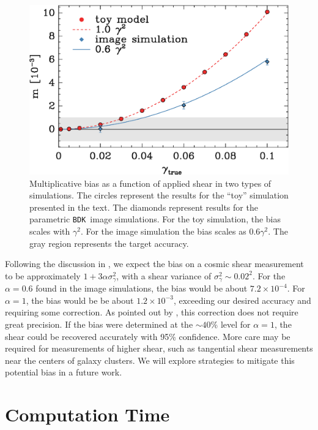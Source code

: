 \documentclass[iop]{emulateapj}
\newcommand{\bdksim}{\texttt{BDK}}
\begin{document}
\begin{figure}
	\centering
    \includegraphics[width=\columnwidth]{weaklens-approx.eps}

    \caption{Multiplicative bias as a function of applied shear in two types of
    simulations.  The circles represent the results for the ``toy'' simulation
    presented in the text.  The diamonds represent results for the parametric
    \bdksim\ image simulations.  For the toy simulation, the bias scales with
    $\gamma^2$.  For the image simulation the bias scales as $0.6 \gamma^2$.
    The gray region represents the target accuracy.}

\label{fig:weaklens}
\end{figure}

Following the discussion in \cite{bfd2016}, we expect the bias on a cosmic
shear measurement to be approximately $1 + 3\alpha\sigma_\gamma^2$, with a
shear variance of $\sigma_\gamma^2 \sim 0.02^2$.  For the $\alpha=0.6$ found in
the image simulations, the bias would be about $7.2 \times 10^{-4}$. 
For $\alpha=1$, the bias would be be about $1.2 \times 10^{-3}$, exceeding our
desired accuracy and requiring some correction.  As pointed out by
\cite{bfd2016}, this correction does not require great precision.  If the bias
were determined at the $\sim 40$\% level for $\alpha=1$,  the shear could be
recovered accurately with 95\% confidence.  More care may be required for
measurements of higher shear, such as tangential shear measurements near the
centers of galaxy clusters.  We will explore strategies to mitigate this
potential bias in a future work.  

\section{Computation Time}
\end{document}
